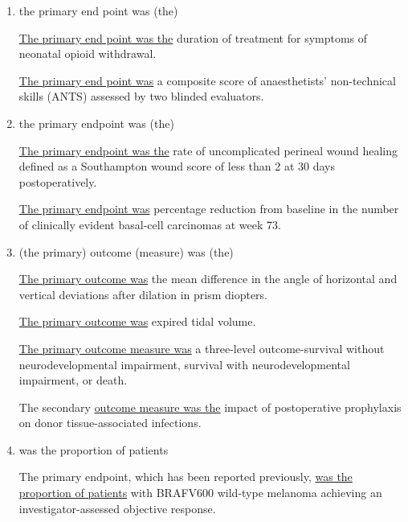\documentclass{ctexbook}
\begin{document}
    \begin{enumerate}
      \item the primary end point was (the)
      \begin{eg}{}
        \uline{The primary end point was the} duration of treatment for symptoms of neonatal opioid withdrawal.        
      \end{eg}

      \begin{eg}{}
        \uline{The primary end point was} a composite score of anaesthetists' non-technical skills (ANTS) assessed by two blinded evaluators.   
      \end{eg}
      
      \item the primary endpoint was (the)
      \begin{eg}{}
        \uline{The primary endpoint was the} rate of uncomplicated perineal wound healing defined as a Southampton wound score of less than 2 at 30 days postoperatively.   
      \end{eg}

      \begin{eg}{}
        \uline{The primary endpoint was} percentage reduction from baseline in the number of clinically evident basal-cell carcinomas at week 73.   
      \end{eg}

      \item (the primary) outcome (measure) was (the)
      \begin{eg}{}
        \uline{The primary outcome was} the mean difference in the angle of horizontal and vertical deviations after dilation in prism diopters.   
      \end{eg}
      \begin{eg}{}
        \uline{The primary outcome was} expired tidal volume.   
      \end{eg}
      \begin{eg}{}
        \uline{The primary outcome measure was} a three-level outcome-survival without neurodevelopmental impairment, survival with neurodevelopmental impairment, or death. 
      \end{eg}
      \begin{eg}{}
        The secondary \uline{outcome measure was the} impact of postoperative prophylaxis on donor tissue-associated infections.   
      \end{eg}

      \item was the proportion of patients
      \begin{eg}{}
        The primary endpoint, which has been reported previously, \uline{was the proportion of patients} with BRAFV600 wild-type melanoma achieving an investigator-assessed objective response.
      \end{eg}


\end{enumerate}
\end{document}
